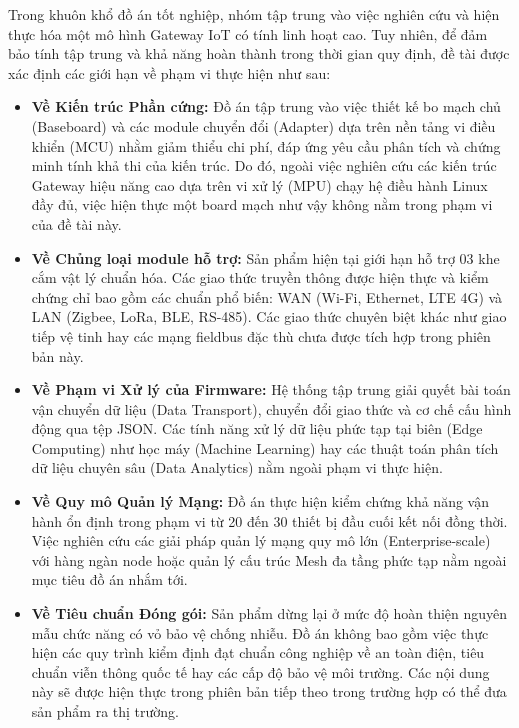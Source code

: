     Trong khuôn khổ đồ án tốt nghiệp, nhóm tập trung vào việc nghiên cứu và hiện thực hóa một mô hình Gateway IoT có tính linh hoạt cao. Tuy nhiên, để đảm bảo tính tập trung và khả năng hoàn thành trong thời gian quy định, đề tài được xác định các giới hạn về phạm vi thực hiện như sau:

    \begin{itemize}
        \item \textbf{Về Kiến trúc Phần cứng:} Đồ án tập trung vào việc thiết kế bo mạch chủ (Baseboard) và các module chuyển đổi (Adapter) dựa trên nền tảng vi điều khiển (MCU) nhằm giảm thiểu chi phí, đáp ứng yêu cầu phân tích và chứng minh tính khả thi của kiến trúc. Do đó, ngoài việc nghiên cứu các kiến trúc Gateway hiệu năng cao dựa trên vi xử lý (MPU) chạy hệ điều hành Linux đầy đủ, việc hiện thực một board mạch như vậy không nằm trong phạm vi của đề tài này.

        \item \textbf{Về Chủng loại module hỗ trợ:} Sản phẩm hiện tại giới hạn hỗ trợ 03 khe cắm vật lý chuẩn hóa. Các giao thức truyền thông được hiện thực và kiểm chứng chỉ bao gồm các chuẩn phổ biến: WAN (Wi-Fi, Ethernet, LTE 4G) và LAN (Zigbee, LoRa, BLE, RS-485). Các giao thức chuyên biệt khác như giao tiếp vệ tinh hay các mạng fieldbus đặc thù chưa được tích hợp trong phiên bản này.

        \item \textbf{Về Phạm vi Xử lý của Firmware:} Hệ thống tập trung giải quyết bài toán vận chuyển dữ liệu (Data Transport), chuyển đổi giao thức và cơ chế cấu hình động qua tệp JSON. Các tính năng xử lý dữ liệu phức tạp tại biên (Edge Computing) như học máy (Machine Learning) hay các thuật toán phân tích dữ liệu chuyên sâu (Data Analytics) nằm ngoài phạm vi thực hiện.

        \item \textbf{Về Quy mô Quản lý Mạng:} Đồ án thực hiện kiểm chứng khả năng vận hành ổn định trong phạm vi từ 20 đến 30 thiết bị đầu cuối kết nối đồng thời. Việc nghiên cứu các giải pháp quản lý mạng quy mô lớn (Enterprise-scale) với hàng ngàn node hoặc quản lý cấu trúc Mesh đa tầng phức tạp nằm ngoài mục tiêu đồ án nhắm tới.

        \item \textbf{Về Tiêu chuẩn Đóng gói:} Sản phẩm dừng lại ở mức độ hoàn thiện nguyên mẫu chức năng có vỏ bảo vệ chống nhiễu. Đồ án không bao gồm việc thực hiện các quy trình kiểm định đạt chuẩn công nghiệp về an toàn điện, tiêu chuẩn viễn thông quốc tế hay các cấp độ bảo vệ môi trường. Các nội dung này sẽ được hiện thực trong phiên bản tiếp theo trong trường hợp có thể đưa sản phẩm ra thị trường.
    \end{itemize}
